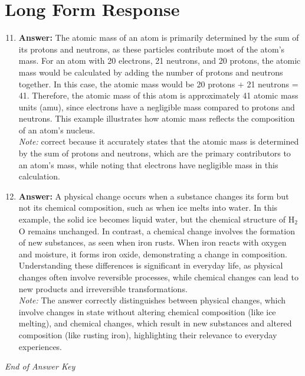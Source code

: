 \documentclass[12pt]{article}
\begin{document}
\section*{Long Form Response}
\begin{enumerate}[label=\arabic*.]
\setcounter{enumi}{10}
\item \textbf{Answer:} The atomic mass of an atom is primarily determined by the sum of its protons and neutrons, as these particles contribute most of the atom's mass. For an atom with 20 electrons, 21 neutrons, and 20 protons, the atomic mass would be calculated by adding the number of protons and neutrons together. In this case, the atomic mass would be 20 protons + 21 neutrons = 41. Therefore, the atomic mass of this atom is approximately 41 atomic mass units (amu), since electrons have a negligible mass compared to protons and neutrons. This example illustrates how atomic mass reflects the composition of an atom's nucleus.
\\ \textit{Note:} correct because it accurately states that the atomic mass is determined by the sum of protons and neutrons, which are the primary contributors to an atom's mass, while noting that electrons have negligible mass in this calculation.
\item \textbf{Answer:} A physical change occurs when a substance changes its form but not its chemical composition, such as when ice melts into water. In this example, the solid ice becomes liquid water, but the chemical structure of H$_{2}$O remains unchanged. In contrast, a chemical change involves the formation of new substances, as seen when iron rusts. When iron reacts with oxygen and moisture, it forms iron oxide, demonstrating a change in composition. Understanding these differences is significant in everyday life, as physical changes often involve reversible processes, while chemical changes can lead to new products and irreversible transformations.
\\ \textit{Note:} The answer correctly distinguishes between physical changes, which involve changes in state without altering chemical composition (like ice melting), and chemical changes, which result in new substances and altered composition (like rusting iron), highlighting their relevance to everyday experiences.
\end{enumerate}

\vfill
\noindent\textit{End of Answer Key}
\end{document}
